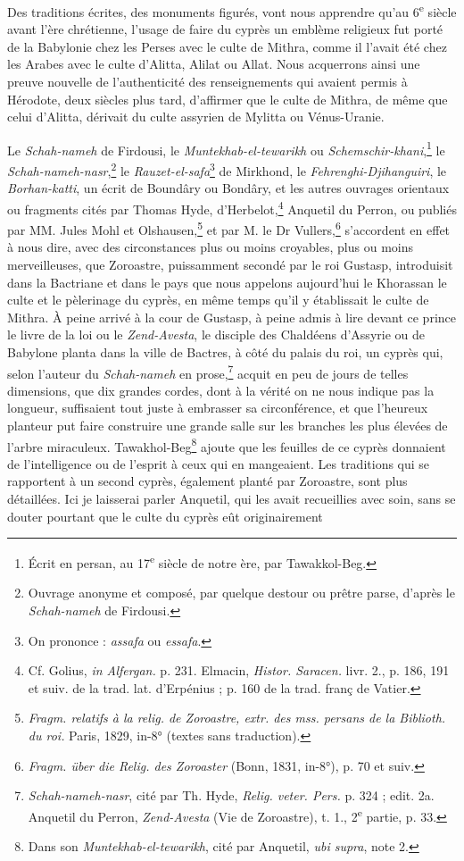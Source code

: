 \documentclass{article}
\begin{document}
Des traditions écrites, des monuments figurés, vont nous apprendre qu'au 6\textsuperscript{e} siècle avant l'ère chrétienne, l'usage de faire du cyprès un emblème religieux fut porté de la Babylonie chez les Perses avec le culte de Mithra, comme il l'avait été chez les Arabes avec le culte d'Alitta, Alilat ou Allat. Nous acquerrons ainsi une preuve nouvelle de l'authenticité des renseignements qui avaient permis à Hérodote, deux siècles plus tard, d'affirmer que le culte de Mithra, de même que celui d'Alitta, dérivait du culte assyrien de Mylitta ou Vénus-Uranie.

Le \emph{Schah-nameh} de Firdousi, le \emph{Muntekhab-el-tewarikh} ou \emph{Schemschir-khani},\footnote{Écrit en persan, au 17\textsuperscript{e} siècle de notre ère, par Tawakkol-Beg.} le \emph{Schah-nameh-nasr},\footnote{Ouvrage anonyme et composé, par quelque destour ou prêtre parse, d'après le \emph{Schah-nameh} de Firdousi.} le \emph{Rauzet-el-safa}\footnote{On prononce : \emph{assafa} ou \emph{essafa}.} de Mirkhond, le \emph{Fehrenghi-Djihanguiri}, le \emph{Borhan-katti}, un écrit de Boundâry ou Bondâry, et les autres ouvrages orientaux ou fragments cités par Thomas Hyde, d'Herbelot,\footnote{Cf. Golius, \emph{in Alfergan.} p. 231. Elmacin, \emph{Histor. Saracen.} livr. 2., p. 186, 191 et suiv. de la trad. lat. d'Erpénius ; p. 160 de la trad. franç de Vatier.} Anquetil du Perron, ou publiés par MM. Jules Mohl et Olshausen,\footnote{\emph{Fragm. relatifs à la relig. de Zoroastre, extr. des mss. persans de la Biblioth. du roi.} Paris, 1829, in-8° (textes sans traduction).} et par M. le Dr Vullers,\footnote{\emph{Fragm. über die Relig. des Zoroaster} (Bonn, 1831, in-8°), p. 70 et suiv.} s'accordent en effet à nous dire, avec des circonstances plus ou moins croyables, plus ou moins merveilleuses, que Zoroastre, puissamment secondé par le roi Gustasp, introduisit dans la Bactriane et dans le pays que nous appelons aujourd'hui le Khorassan le culte et le pèlerinage du cyprès, en même temps qu'il y établissait le culte de Mithra. À peine arrivé à la cour de Gustasp, à peine admis à lire devant ce prince le livre de la loi ou le \emph{Zend-Avesta}, le disciple des Chaldéens d'Assyrie ou de Babylone planta dans la ville de Bactres, à côté du palais du roi, un cyprès qui, selon l'auteur du \emph{Schah-nameh} en prose,\footnote{\emph{Schah-nameh-nasr}, cité par Th. Hyde, \emph{Relig. veter. Pers.} p. 324 ; edit. 2a. Anquetil du Perron, \emph{Zend-Avesta} (Vie de Zoroastre), t. 1., 2\textsuperscript{e} partie, p. 33.} acquit en peu de jours de telles dimensions, que dix grandes cordes, dont à la vérité on ne nous indique pas la longueur, suffisaient tout juste à embrasser sa circonférence, et que l'heureux planteur put faire construire une grande salle sur les branches les plus élevées de l'arbre miraculeux. Tawakhol-Beg\footnote{Dans son \emph{Muntekhab-el-tewarikh}, cité par Anquetil, \emph{ubi supra}, note 2.} ajoute que les feuilles de ce cyprès donnaient de l'intelligence ou de l'esprit à ceux qui en mangeaient. Les traditions qui se rapportent à un second cyprès, également planté par Zoroastre, sont plus détaillées. Ici je laisserai parler Anquetil, qui les avait recueillies avec soin, sans se douter pourtant que le culte du cyprès eût originairement 
\end{document}
